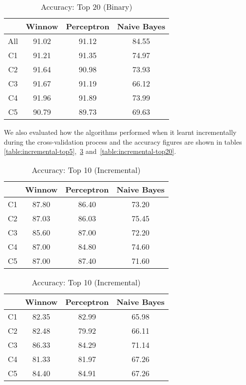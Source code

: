 \documentclass[senior,oneside]{UIUC}
\begin{document}
\begin{table}
\centering
\begin{tabular}{c | c c c}
\hline \hline
 & Winnow & Perceptron & Naive Bayes \\ [0.5ex]
\hline
All & 91.02 & 91.12 & 84.55 \\
C1 & 91.21 & 91.35 & 74.97 \\
C2 & 91.64 & 90.98 & 73.93 \\
C3 & 91.67 & 91.19 & 66.12 \\
C4 & 91.96 & 91.89 & 73.99 \\
C5 & 90.79 & 89.73 & 69.63 \\
\end{tabular}
\caption{Accuracy: Top 20 (Binary)}
\label{table:binary-top20}
\end{table}

We also evaluated how the algorithms performed when it learnt incrementally during the cross-validation process and the accuracy figures are shown in tables \ref{table:incremental-top5},~\ref{table:incremental-top10} and~\ref{table:incremental-top20}.

\begin{table}
\parbox{.45\linewidth}{
\centering
\begin{tabular}{c | c c c}
\hline \hline
 & Winnow & Perceptron & Naive Bayes \\ [0.5ex]
\hline
C1 & 87.80 & 86.40 & 73.20  \\
C2 & 87.03 & 86.03 & 75.45  \\
C3 & 85.60 & 87.00 & 72.20  \\
C4 & 87.00 & 84.80 & 74.60  \\
C5 & 87.00 & 87.40 & 71.60  \\
\end{tabular}
\caption{Accuracy: Top 5 (Incremental)}
\label{table:incremental-top5}
}
\hfill
\parbox{.45\linewidth}{
\centering
\begin{tabular}{c | c c c}
\hline \hline
 & Winnow & Perceptron & Naive Bayes \\ [0.5ex]
\hline
C1 & 82.35 & 82.99 & 65.98  \\
C2 & 82.48 & 79.92 & 66.11  \\
C3 & 86.33 & 84.29 & 71.14  \\
C4 & 81.33 & 81.97 & 67.26  \\
C5 & 84.40 & 84.91 & 67.26  \\
\end{tabular}
\caption{Accuracy: Top 10 (Incremental)}
\label{table:incremental-top10}
}
\end{table}
\end{document}
